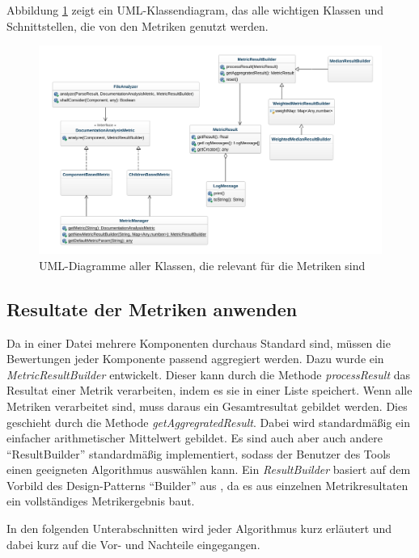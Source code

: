 Abbildung \ref{fig:uml_metrics}  zeigt ein UML-Klassendiagram, das alle wichtigen Klassen und Schnittstellen, die von den Metriken genutzt werden. 
\begin{figure}
    \centering
    \includegraphics[width=\columnwidth]{figures/uml/metriken.png}
    \caption{UML-Diagramme aller Klassen, die relevant für die Metriken sind}
    \label{fig:uml_metrics}
\end{figure}
\bigskip
\subsection{Resultate der Metriken anwenden}
Da in einer Datei mehrere Komponenten durchaus Standard sind, müssen die Bewertungen jeder Komponente passend aggregiert werden. Dazu wurde ein \textit{MetricResultBuilder} entwickelt. Dieser kann durch die Methode \textit{processResult} das Resultat einer Metrik verarbeiten, indem es sie in einer Liste speichert. Wenn alle Metriken verarbeitet sind, muss daraus ein Gesamtresultat gebildet werden. Dies geschieht durch die Methode \textit{getAggregratedResult}. Dabei wird standardmäßig ein einfacher arithmetischer Mittelwert gebildet. Es sind auch aber auch andere \enquote{ResultBuilder} standardmäßig implementiert, sodass der Benutzer des Tools einen geeigneten Algorithmus auswählen kann. Ein \textit{ResultBuilder} basiert auf dem Vorbild des Design-Patterns \enquote{Builder} aus \cite[S.139-149]{gamma2015design}, da es aus einzelnen Metrikresultaten ein vollständiges Metrikergebnis baut. 

In den folgenden Unterabschnitten wird jeder Algorithmus kurz erläutert und dabei kurz auf die Vor- und Nachteile eingegangen. 

